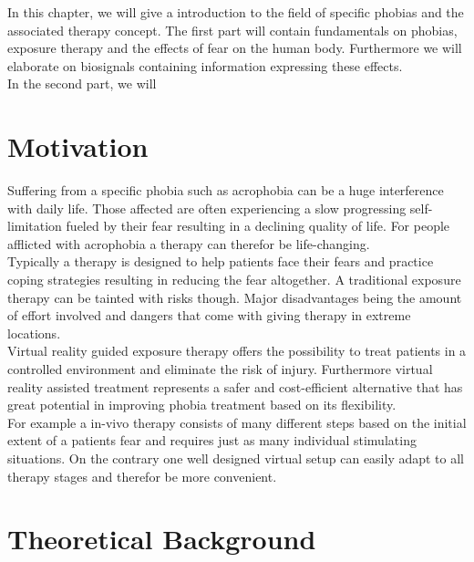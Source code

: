 
In this chapter, we will give a introduction to the field of specific phobias and the associated therapy concept. The first part will contain fundamentals on phobias, exposure therapy and the effects of fear on the human body. Furthermore we will elaborate on biosignals containing information expressing these effects.\\
In the second part, we will 
 
\section{Motivation}

Suffering from a specific phobia such as acrophobia can be a huge interference with daily life. Those affected are often experiencing a slow progressing self-limitation fueled by their fear resulting in a declining quality of life. For people afflicted with acrophobia a therapy can therefor be life-changing.\\
Typically a therapy is designed to help patients face their fears and practice coping strategies resulting in reducing the fear altogether. A traditional exposure therapy can  be tainted with risks though. Major disadvantages being the amount of effort involved and dangers that come with giving therapy in extreme locations.\\
Virtual reality guided exposure therapy offers the possibility to treat patients in a controlled environment and eliminate the risk of injury. Furthermore virtual reality assisted treatment represents a safer and cost-efficient alternative that has great potential in improving phobia treatment based on its flexibility.\\
For example a in-vivo therapy consists of many different steps based on the initial extent of a patients fear and requires just as many individual stimulating situations. On the contrary one well designed virtual setup can easily adapt to all therapy stages and therefor be more convenient.\\



\section{Theoretical Background}

